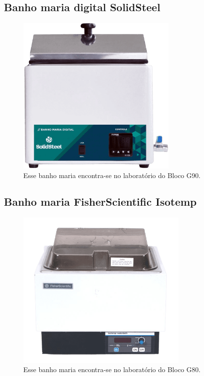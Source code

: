\documentclass[
  letterpaper,
  DIV=11,
  numbers=noendperiod]{scrreprt}
\begin{document}
\hypertarget{banho-maria-digital-solidsteel}{%
\subsection{Banho maria digital
SolidSteel}\label{banho-maria-digital-solidsteel}}

\begin{figure}

{\centering \includegraphics[width=\textwidth,height=3.125in]{figures/equipamentos/banho_maria_digital.png}

}

\caption{Esse banho maria encontra-se no laboratório do Bloco G90.}

\end{figure}

\hypertarget{banho-maria-fisherscientific-isotemp}{%
\subsection{Banho maria FisherScientific
Isotemp}\label{banho-maria-fisherscientific-isotemp}}

\begin{figure}

{\centering \includegraphics[width=\textwidth,height=3.125in]{figures/equipamentos/banho_maria_fischer.png}

}

\caption{Esse banho maria encontra-se no laboratório do Bloco G80.}

\end{figure}
\end{document}
